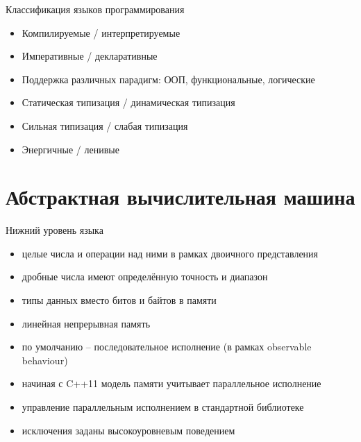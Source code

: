 \documentclass[unknownkeysallowed,xcolor=table]{beamer}
\begin{document}
\begin{frame}{Классификация языков программирования}
  \begin{itemize}
    \item Компилируемые / интерпретируемые \vspace{1em}
    \item Императивные / декларативные \vspace{1em}
    \item Поддержка различных парадигм: ООП, функциональные, логические \vspace{1em}
    \item Статическая типизация / динамическая типизация \vspace{1em}
    \item Сильная типизация / слабая типизация \vspace{1em}
    \item Энергичные / ленивые
  \end{itemize}
\end{frame}

\section{Абстрактная вычислительная машина}

\begin{frame}{Нижний уровень языка}
  \begin{itemize}
    \item целые числа и операции над ними в рамках двоичного представления
    \item дробные числа имеют определённую точность и диапазон
    \item типы данных вместо битов и байтов в памяти
    \item линейная непрерывная память
    \item по умолчанию -- последовательное исполнение (в рамках observable behaviour)
    \item начиная с C++11 модель памяти учитывает параллельное исполнение
    \item управление параллельным исполнением в стандартной библиотеке
    \item исключения заданы высокоуровневым поведением
  \end{itemize}
\end{frame}
\end{document}
